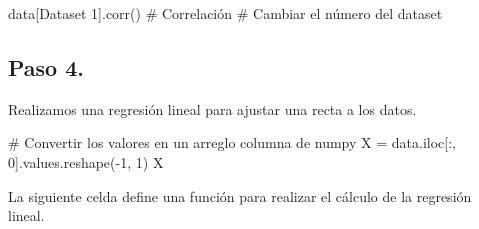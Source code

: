 \documentclass[
  letterpaper,
  DIV=11,
  numbers=noendperiod]{scrreprt}
\newenvironment{Shaded}{\begin{snugshade}}{\end{snugshade}}
\newcommand{\CommentTok}[1]{\textcolor[rgb]{0.37,0.37,0.37}{#1}}
\newcommand{\DecValTok}[1]{\textcolor[rgb]{0.68,0.00,0.00}{#1}}
\newcommand{\NormalTok}[1]{\textcolor[rgb]{0.00,0.23,0.31}{#1}}
\newcommand{\OperatorTok}[1]{\textcolor[rgb]{0.37,0.37,0.37}{#1}}
\newcommand{\StringTok}[1]{\textcolor[rgb]{0.13,0.47,0.30}{#1}}
\begin{document}
\begin{Shaded}
\begin{Highlighting}[]
\NormalTok{data[}\StringTok{\textquotesingle{}Dataset 1\textquotesingle{}}\NormalTok{].corr() }\CommentTok{\# Correlación}
                        \CommentTok{\# Cambiar el número del dataset}
\end{Highlighting}
\end{Shaded}

\subsection{Paso 4.}\label{paso-4.}

Realizamos una regresión lineal para ajustar una recta a los datos.

\begin{Shaded}
\begin{Highlighting}[]
\CommentTok{\# Convertir los valores en un arreglo columna de numpy}
\NormalTok{X }\OperatorTok{=}\NormalTok{ data.iloc[:, }\DecValTok{0}\NormalTok{].values.reshape(}\OperatorTok{{-}}\DecValTok{1}\NormalTok{, }\DecValTok{1}\NormalTok{)}
\NormalTok{X}
\end{Highlighting}
\end{Shaded}

La siguiente celda define una función para realizar el cálculo de la
regresión lineal.
\end{document}
